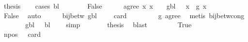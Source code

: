\begin{isabellebody}
\ {\isacharquery}{\kern0pt}thesis\isanewline
\ \ \isamarkupfalse%
\ {\isacharparenleft}{\kern0pt}cases\ {\isachardoublequoteopen}bl\ {\isasymin}\ {\isasymGamma}{\isachardoublequoteclose}{\isacharparenright}{\kern0pt}\isanewline
\ \ \ \ \isamarkupfalse%
\ False\isanewline
\ \ \ \ \isamarkupfalse%
\ agree{\isacharcolon}{\kern0pt}\ {\isachardoublequoteopen}{\isasymAnd}x{\isachardot}{\kern0pt}\ x\ {\isasymin}\ {\isasymGamma}\ {\isasymLongrightarrow}\ {\isacharparenleft}{\kern0pt}g{\isacharparenleft}{\kern0pt}bl\ {\isacharcolon}{\kern0pt}{\isacharequal}{\kern0pt}\ {}{\isacharparenright}{\kern0pt}{\isacharparenright}{\kern0pt}\ x\ {\isacharequal}{\kern0pt}\ g\ x{\isachardoublequoteclose}\isanewline
\ \ \ \ \ \ \isamarkupfalse%
\ False\ \isamarkupfalse%
\ auto\isanewline
\ \ \ \ \isamarkupfalse%
\ {\isachardoublequoteopen}bij{\isacharunderscore}{\kern0pt}betw\ {\isacharparenleft}{\kern0pt}g{\isacharparenleft}{\kern0pt}bl\ {\isacharcolon}{\kern0pt}{\isacharequal}{\kern0pt}\ {}{\isacharparenright}{\kern0pt}{\isacharparenright}{\kern0pt}\ {\isasymGamma}\ {\isacharbraceleft}{\kern0pt}{\isachardot}{\kern0pt}{\isachardot}{\kern0pt}{\isacharless}{\kern0pt}\ card\ {\isasymGamma}{\isacharbraceright}{\kern0pt}{\isachardoublequoteclose}\isanewline
\ \ \ \ \ \ \isamarkupfalse%
\ g\ agree\ \isamarkupfalse%
\ {\isacharparenleft}{\kern0pt}metis\ bij{\isacharunderscore}{\kern0pt}betw{\isacharunderscore}{\kern0pt}cong{\isacharparenright}{\kern0pt}\isanewline
\ \ \ \ \isamarkupfalse%
\ \isamarkupfalse%
\ {\isachardoublequoteopen}{\isacharparenleft}{\kern0pt}g{\isacharparenleft}{\kern0pt}bl\ {\isacharcolon}{\kern0pt}{\isacharequal}{\kern0pt}\ {}{\isacharparenright}{\kern0pt}{\isacharparenright}{\kern0pt}\ bl\ {\isacharequal}{\kern0pt}\ {}{\isachardoublequoteclose}\ \isamarkupfalse%
\ simp\isanewline
\ \ \ \ \isamarkupfalse%
\ \isamarkupfalse%
\ {\isacharquery}{\kern0pt}thesis\ \isamarkupfalse%
\ blast\isanewline
\ \ \isamarkupfalse%
\isanewline
\ \ \ \ \isamarkupfalse%
\ True\isanewline
\ \ \ \ \isamarkupfalse%
\ npos{\isacharcolon}{\kern0pt}\ {\isachardoublequoteopen}{}\ {\isacharless}{\kern0pt}\ card\ {\isasymGamma}{\isachardoublequoteclose}\ \isamarkupfalse%

\end{isabellebody}
